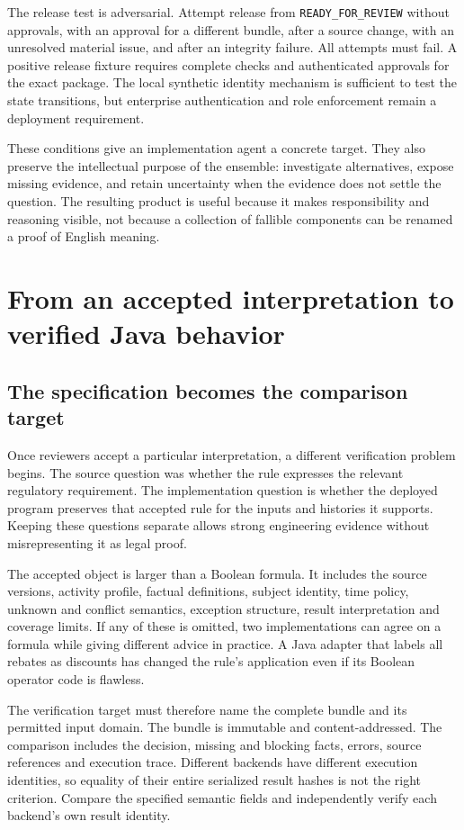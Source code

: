 \documentclass[12pt,a4paper,oneside,openany]{book}
\begin{document}
The release test is adversarial. Attempt release from
\texttt{READY\_FOR\_REVIEW} without approvals, with an approval for a different
bundle, after a source change, with an unresolved material issue, and after an
integrity failure. All attempts must fail. A positive release fixture requires
complete checks and authenticated approvals for the exact package. The local
synthetic identity mechanism is sufficient to test the state transitions, but
enterprise authentication and role enforcement remain a deployment requirement.

These conditions give an implementation agent a concrete target. They also
preserve the intellectual purpose of the ensemble: investigate alternatives,
expose missing evidence, and retain uncertainty when the evidence does not settle
the question. The resulting product is useful because it makes responsibility
and reasoning visible, not because a collection of fallible components can be
renamed a proof of English meaning.

\chapter{From an accepted interpretation to verified Java behavior}
\label{ch:verification}

\section{The specification becomes the comparison target}

Once reviewers accept a particular interpretation, a different verification
problem begins. The source question was whether the rule expresses the relevant
regulatory requirement. The implementation question is whether the deployed
program preserves that accepted rule for the inputs and histories it supports.
Keeping these questions separate allows strong engineering evidence without
misrepresenting it as legal proof.

The accepted object is larger than a Boolean formula. It includes the source
versions, activity profile, factual definitions, subject identity, time policy,
unknown and conflict semantics, exception structure, result interpretation and
coverage limits. If any of these is omitted, two implementations can agree on a
formula while giving different advice in practice. A Java adapter that labels
all rebates as discounts has changed the rule's application even if its Boolean
operator code is flawless.

The verification target must therefore name the complete bundle and its
permitted input domain. The bundle is immutable and content-addressed. The
comparison includes the decision, missing and blocking facts, errors, source
references and execution trace. Different backends have different execution
identities, so equality of their entire serialized result hashes is not the
right criterion. Compare the specified semantic fields and independently verify
each backend's own result identity.
\end{document}
